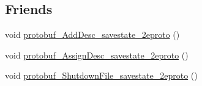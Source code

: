 \subsection*{Friends}
\begin{DoxyCompactItemize}
\item 
void \hyperlink{class_save_state___card_info_a6c158c382b70217710599263699c97b8}{protobuf\-\_\-\-Add\-Desc\-\_\-savestate\-\_\-2eproto} ()
\item 
void \hyperlink{class_save_state___card_info_ad76d2b61ce7efa59b3fa8cc9a2e22804}{protobuf\-\_\-\-Assign\-Desc\-\_\-savestate\-\_\-2eproto} ()
\item 
void \hyperlink{class_save_state___card_info_a1ecf56abe5c72689d00559c47c8e69f7}{protobuf\-\_\-\-Shutdown\-File\-\_\-savestate\-\_\-2eproto} ()
\end{DoxyCompactItemize}


